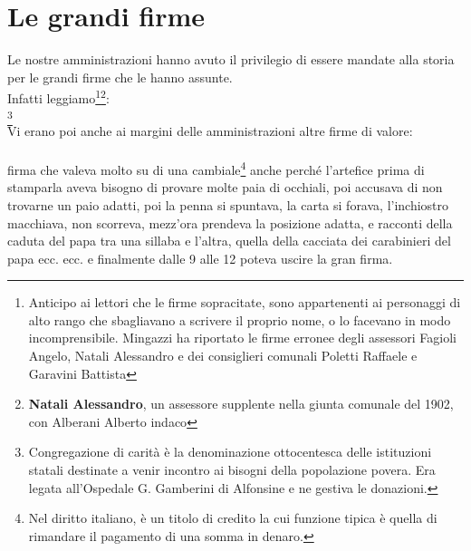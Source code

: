 
\chapter{Le grandi firme}
Le nostre amministrazioni hanno avuto il privilegio di essere mandate alla storia per le grandi firme che le hanno assunte.\\
Infatti leggiamo\footnote{Anticipo ai lettori che le firme sopracitate, sono appartenenti ai personaggi di alto rango che sbagliavano a scrivere il proprio nome, o lo facevano in modo incomprensibile. Mingazzi ha riportato le firme erronee degli assessori Fagioli Angelo, Natali Alessandro e dei consiglieri comunali Poletti Raffaele e Garavini Battista}\footnote{\textbf{Natali Alessandro}, un assessore supplente nella giunta comunale del 1902, con Alberani Alberto indaco}:
\\   
\normalfont
\footnote{Congregazione di carità è la denominazione ottocentesca delle istituzioni statali destinate a venir incontro ai bisogni della popolazione povera. Era legata all'Ospedale G. Gamberini di Alfonsine e ne gestiva le donazioni.}\\
\indent Vi erano poi anche ai margini delle amministrazioni altre firme di valore:
\\ \\
\normalfont
firma che valeva molto su di una cambiale\footnote{Nel diritto italiano, è un titolo di credito la cui funzione tipica è quella di rimandare il pagamento di una somma in denaro.} anche perché l'artefice prima di stamparla aveva bisogno di provare molte paia di occhiali, poi accusava di non trovarne un paio adatti, poi la penna si spuntava, la carta si forava, l'inchiostro macchiava, non scorreva, mezz'ora prendeva la posizione adatta, e racconti della caduta del papa tra una sillaba e l'altra, quella della cacciata dei carabinieri del papa ecc. ecc. e finalmente dalle 9 alle 12 poteva uscire la gran firma. \\

